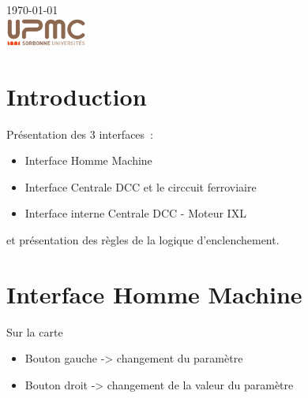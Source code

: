 \begin{titlepage}
{\large \today}\\[2cm] %


\includegraphics[width=0.2\textwidth]{logo.png}


\vfill %

\end{titlepage}




\section{Introduction}
\label{sec:introduction}
Présentation des 3 interfaces~:
\begin{itemize}
\item Interface Homme Machine
\item Interface Centrale DCC et le circcuit ferroviaire
\item Interface interne Centrale DCC - Moteur IXL
\end{itemize}

et présentation des règles de la logique d'enclenchement.


\section{Interface Homme Machine}
\label{sec:int-dcc}
Sur la carte
\begin{itemize}
\item Bouton gauche -> changement du paramètre
\item Bouton droit  -> changement de la valeur du paramètre
\end{itemize}

